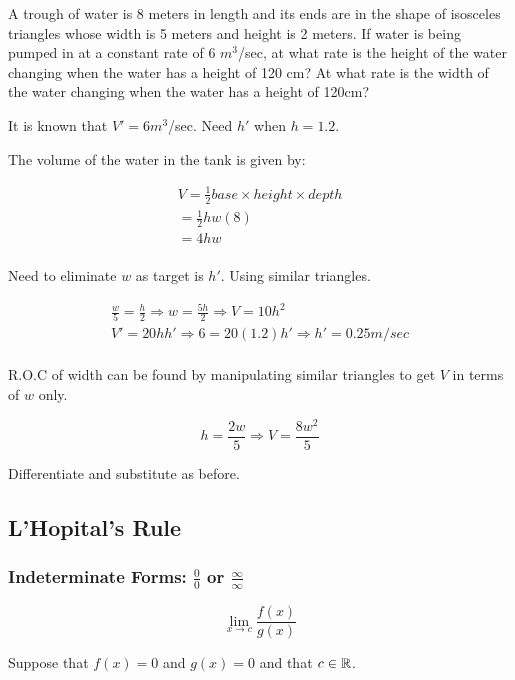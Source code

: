 A trough of water is 8 meters in length and its ends are in the shape of isosceles triangles whose width is 5 meters and height is 2 meters.
If water is being pumped in at a constant rate of 6 $m^3$/sec, 
at what rate is the height of the water changing when the water has a height of 120 cm? 
At what rate is the width of the water changing when the water has a height of 120cm?

\vspace{5mm}

It is known that $V'=6 m^3$/sec.
Need $h'$ when $h=1.2$.

\vspace{5mm}

The volume of the water in the tank is given by:

\begin{gather*}
    V=\frac{1}{2}base\times{height}\times{depth}\\
    =\frac{1}{2}hw(8)\\
    =4hw\\
\end{gather*}

Need to eliminate $w$ as target is $h'$.
Using similar triangles.

\begin{gather*}
    \frac{w}{5}=\frac{h}{2} \Rightarrow w=\frac{5h}{2} \Rightarrow V=10h^2\\
    V'=20hh' \Rightarrow 6=20(1.2)h' \Rightarrow h'=0.25m/sec\\
\end{gather*}

R.O.C of width can be found by manipulating similar triangles to get $V$ in terms of $w$ only.

\[h=\frac{2w}{5} \Rightarrow V=\frac{8w^2}{5}\]

Differentiate and substitute as before.

\subsection{L'Hopital's Rule}\label{subsec:l'hopital's-rule}

\subsubsection{Indeterminate Forms: $\frac{0}{0}$ or $\frac{\infty}{\infty}$}

\[\lim_{x\to{c}}\frac{f(x)}{g(x)}\]

Suppose that $f(x)=0$ and $g(x)=0$ and that $c \in \mathbb{R}$.

